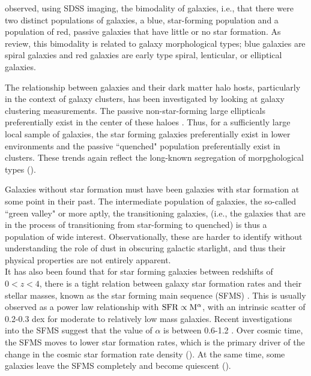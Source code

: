 \citet{2001AJ....122.1861S} observed, using SDSS imaging, the
bimodality of galaxies, i.e., that there were two distinct populations
of galaxies, a blue, star-forming population and a population of red,
passive galaxies that have little or no star formation. As
\citet{blanton_physical_2009-1} review, this bimodality is related to
galaxy morphological types; blue galaxies are spiral galaxies and red
galaxies are early type spiral, lenticular, or elliptical galaxies.

The relationship between galaxies and their dark matter halo hosts,
particularly in the context of galaxy clusters, has been investigated
by looking at galaxy clustering measurements.  The passive
non-star-forming large ellipticals preferentially exist in the center
of these haloes \citep{2005ApJ...633..791Z}. Thus, for a sufficiently
large local sample of galaxies, the star forming galaxies
preferentially exist in lower environments and the passive ``quenched"
population preferentially exist in clusters. These trends again
reflect the long-known segregation of morpghological types
(\citealt{dressler_galaxy_1980}).

Galaxies without star formation must have been galaxies with star
formation at some point in their past. The intermediate population of
galaxies, the so-called ``green valley" \citep{2007ApJS..173..293W} or
more aptly, the transitioning galaxies, (i.e., the galaxies that are
in the process of transitioning from star-forming to quenched) is thus
a population of wide interest. Observationally, these are harder to
identify without understanding the role of dust in obscuring galactic
starlight, and thus their physical properties are not entirely
apparent.\\

It has also been found that for star forming galaxies between
redshifts of $0 < z < 4$, there is a tight relation between galaxy
star formation rates and their stellar masses, known as the star
forming main sequence (SFMS) \citep{brinchmann_physical_2004,
  2007ApJ...660L..43N, 2015A&A...575A..74S}. This is usually observed
as a power law relationship with ${\rm SFR} \propto {\rm M}^{\alpha}$,
with an intrinsic scatter of 0.2-0.3 dex for moderate to relatively
low mass galaxies. Recent investigations into the SFMS suggest that
the value of $\alpha$ is between 0.6-1.2
\citep{2014ApJS..214...15S}. Over cosmic time, the SFMS moves to lower
star formation rates, which is the primary driver of the change in the
cosmic star formation rate density (\citealt{madau_cosmic_2014}). At
the same time, some galaxies leave the SFMS completely and become
quiescent (\citealt{moustakas_primus:_2013, hahn_primus_2015}).

